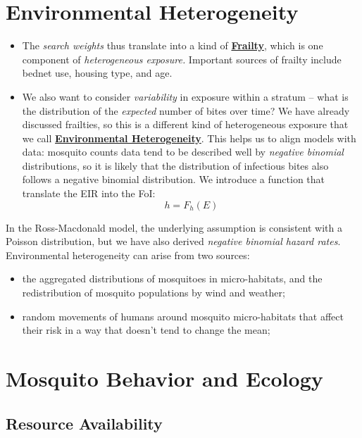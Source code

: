 \documentclass[
]{book}
\begin{document}
\hypertarget{environmental-heterogeneity}{%
\section{Environmental Heterogeneity}\label{environmental-heterogeneity}}

\begin{itemize}
\item
  The \emph{search weights} thus translate into a kind of \textbf{\protect\hyperlink{frailty}{Frailty}}, which is one component of \emph{heterogeneous exposure.} Important sources of frailty include bednet use, housing type, and age.
\item
  We also want to consider \emph{variability} in exposure within a stratum -- what is the distribution of the \emph{expected} number of bites over time? We have already discussed frailties, so this is a different kind of heterogeneous exposure that we call \textbf{\protect\hyperlink{environmental-heterogeneity}{Environmental Heterogeneity}}. This helps us to align models with data: mosquito counts data tend to be described well by \emph{negative binomial} distributions, so it is likely that the distribution of infectious bites also follows a negative binomial distribution. We introduce a function that translate the EIR into the FoI:
  \[h=F_h(E)\]
\end{itemize}

In the Ross-Macdonald model, the underlying assumption is consistent with a Poisson distribution, but we have also derived \emph{negative binomial hazard rates}. Environmental heterogeneity can arise from two sources:

\begin{itemize}
\item
  the aggregated distributions of mosquitoes in micro-habitats, and the redistribution of mosquito populations by wind and weather;
\item
  random movements of humans around mosquito micro-habitats that affect their risk in a way that doesn't tend to change the mean;
\end{itemize}

\hypertarget{mosquito-behavior-and-ecology}{%
\section{Mosquito Behavior and Ecology}\label{mosquito-behavior-and-ecology}}

\hypertarget{resource-availability}{%
\subsection{Resource Availability}\label{resource-availability}}
\end{document}
